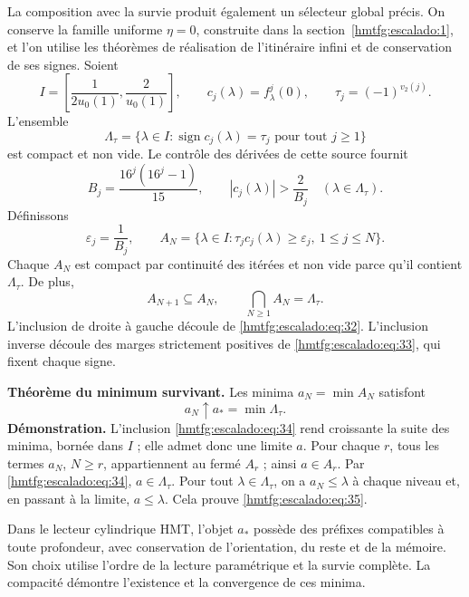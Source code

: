 La composition avec la survie produit également un sélecteur global précis. On conserve la famille uniforme \(\eta=0\), construite dans la section~\ref{hmtfg:escalado:1}, et l’on utilise les théorèmes de réalisation de l’itinéraire infini et de conservation de ses signes. Soient
\[
I=\left[\frac1{2u_0(1)},\frac2{u_0(1)}\right],\qquad
c_j(\lambda)=f_\lambda^j(0),\qquad
\tau_j=(-1)^{v_2(j)}.
\]
L’ensemble
\[
\Lambda_\tau=\{\lambda\in I:\operatorname{sign}c_j(\lambda)=\tau_j
\text{ pour tout }j\ge1\}
\]
est compact et non vide. Le contrôle des dérivées de cette source fournit
\begin{equation}
B_j=\frac{16^j(16^j-1)}{15},\qquad
|c_j(\lambda)|>\frac2{B_j}\quad(\lambda\in\Lambda_\tau).
\label{hmtfg:escalado:eq:32}
\end{equation}
Définissons
\begin{equation}
\varepsilon_j=\frac1{B_j},\qquad
A_N=\{\lambda\in I:\tau_jc_j(\lambda)\ge\varepsilon_j,\
1\le j\le N\}.
\label{hmtfg:escalado:eq:33}
\end{equation}
Chaque \(A_N\) est compact par continuité des itérées et non vide parce qu’il contient \(\Lambda_\tau\). De plus,
\begin{equation}
A_{N+1}\subseteq A_N,\qquad
\bigcap_{N\ge1}A_N=\Lambda_\tau.
\label{hmtfg:escalado:eq:34}
\end{equation}
L’inclusion de droite à gauche découle de \eqref{hmtfg:escalado:eq:32}. L’inclusion inverse découle des marges strictement positives de \eqref{hmtfg:escalado:eq:33}, qui fixent chaque signe.

\textbf{Théorème du minimum survivant.} Les minima \(a_N=\min A_N\) satisfont
\begin{equation}
\boxed{a_N\uparrow a_*=\min\Lambda_\tau.}
\label{hmtfg:escalado:eq:35}
\end{equation}
\textbf{Démonstration.} L’inclusion \eqref{hmtfg:escalado:eq:34} rend croissante la suite des minima, bornée dans \(I\) ; elle admet donc une limite \(a\). Pour chaque \(r\), tous les termes \(a_N\), \(N\ge r\), appartiennent au fermé \(A_r\) ; ainsi \(a\in A_r\). Par \eqref{hmtfg:escalado:eq:34}, \(a\in\Lambda_\tau\). Pour tout \(\lambda\in\Lambda_\tau\), on a \(a_N\le\lambda\) à chaque niveau et, en passant à la limite, \(a\le\lambda\). Cela prouve \eqref{hmtfg:escalado:eq:35}.

Dans le lecteur cylindrique HMT, l’objet \(a_*\) possède des préfixes compatibles à toute profondeur, avec conservation de l’orientation, du reste et de la mémoire. Son choix utilise l’ordre de la lecture paramétrique et la survie complète. La compacité démontre l’existence et la convergence de ces minima.

